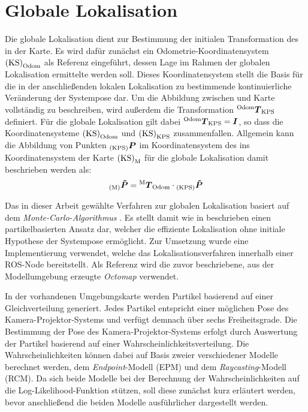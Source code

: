 \section{Globale Lokalisation}
\label{chap.globloc}
Die globale Lokalisation dient zur Bestimmung der initialen Transformation des  in der Karte. Es wird dafür zunächst ein Odometrie-Koordinatensystem ${\mathrm{(KS)}}_{\mathrm{Odom}}$ als Referenz eingeführt, dessen Lage im Rahmen der globalen Lokalisation ermittelte werden soll. Dieses Koordinatensystem stellt die Basis für die in der anschließenden lokalen Lokalisation zu bestimmende kontinuierliche Veränderung der Systempose dar. Um die Abbildung zwischen \kps{} und Karte vollständig zu beschreiben, wird außerdem die Transformation ${^{\mathrm{Odom}}\mbox{\boldmath{$T$}}_{\mathrm{KPS}}}$ definiert. Für die globale Lokalisation gilt dabei ${^{\mathrm{Odom}}\mbox{\boldmath{$T$}}_{\mathrm{KPS}}} = \mbox{\boldmath{$I$}}$, so dass die Koordinatensysteme ${\mathrm{(KS)}}_{\mathrm{Odom}}$ und ${\mathrm{(KS)}}_{\mathrm{KPS}}$ zusammenfallen. Allgemein kann die Abbildung von Punkten ${_{{\mathrm{(KPS)}}}}\mbox{\boldmath{$P$}}$ im Koordinatensystem des  ins Koordinatensystem der Karte ${\mathrm{(KS)}}_{\mathrm{M}}$ für die globale Lokalisation damit beschrieben werden als:
%
\begin{equation}
{_{{\mathrm{(M)}}}}\mbox{\boldmath{$\tilde{P}$}} = {^{\mathrm{M}}\mbox{\boldmath{$T$}}_{\mathrm{Odom}}} \cdot {_{{\mathrm{(KPS)}}}}\mbox{\boldmath{$\tilde{P}$}}
\label{eq.globloc}
\end{equation}


Das in dieser Arbeit gewählte Verfahren zur globalen Lokalisation basiert auf dem \textit{Monte-Carlo-Algorithmus} \cite{Dellaert1999}. Es stellt damit wie in  beschrieben einen partikelbasierten Ansatz dar, welcher die effiziente Lokalisation ohne initiale Hypothese der Systempose ermöglicht. Zur Umsetzung wurde eine Implementierung \cite{humanoidNavigation} verwendet, welche das Lokalisationsverfahren innerhalb einer ROS-Node bereitstellt. Als Referenz wird die zuvor beschriebene, aus der Modellumgebung erzeugte \textit{Octomap} verwendet.\\

\prever{
}

In der vorhandenen Umgebungskarte werden Partikel basierend auf einer Gleichverteilung generiert. Jedes Partikel entspricht einer möglichen Pose des Kamera-Projektor-Systems und verfügt demnach über sechs Freiheitsgrade. Die Bestimmung der Pose des Kamera-Projektor-Systems erfolgt durch Auswertung der Partikel basierend auf einer Wahrscheinlichkeitsverteilung. Die Wahrscheinlichkeiten können dabei auf Basis zweier verschiedener Modelle berechnet werden, dem \textit{Endpoint}-Modell (EPM) und dem \textit{Raycasting}-Modell (RCM). Da sich beide Modelle bei der Berechnung der Wahrscheinlichkeiten auf die Log-Likelihood-Funktion stützen, soll diese zunächst kurz erläutert werden, bevor anschließend die beiden Modelle ausführlicher dargestellt werden.


